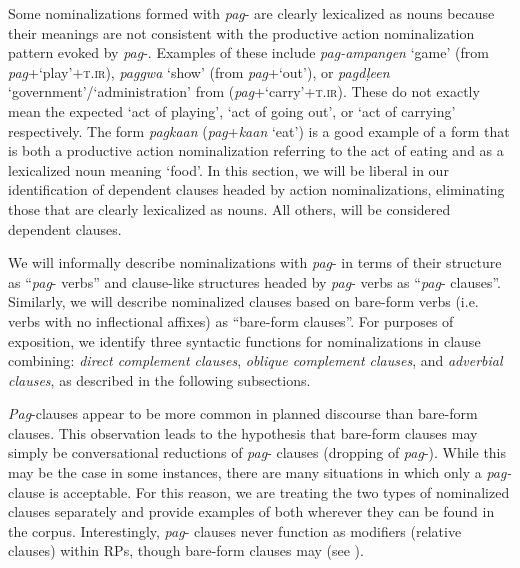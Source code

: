 Some nominalizations formed with \textit{pag}- are clearly lexicalized as nouns because their meanings are not consistent with the productive action nominalization pattern evoked by \textit{pag}-. Examples of these include \textit{pag-ampangen} ‘game’ (from \textit{pag}+‘play’+\textsc{t.ir}), \textit{paggwa} ‘show’ (from \textit{pag}+‘out’), or \textit{pagdļeen} ‘government’/‘administration’ from (\textit{pag}+‘carry’+\textsc{t.ir}). These do not exactly mean the expected ‘act of playing', ‘act of going out', or ‘act of carrying' respectively. The form \textit{pagkaan} (\textit{pag}+\textit{kaan} ‘eat’) is a good example of a form that is both a productive action nominalization referring to the act of eating and as a lexicalized noun meaning ‘food’. In this section, we will be liberal in our identification of dependent clauses headed by action nominalizations, eliminating those that are clearly lexicalized as nouns.  All others,  will be considered dependent clauses.

We will informally describe nominalizations with \textit{pag}{}- in terms of their structure as “\textit{pag}{}- verbs” and clause-like structures headed by \textit{pag}{}- verbs as “\textit{pag}{}- clauses”. Similarly, we will describe nominalized clauses based on bare-form verbs (i.e. verbs with no inflectional affixes) as “bare-form clauses”. For purposes of exposition, we identify three syntactic functions for nominalizations in clause combining: \textit{direct complement clauses}, \textit{oblique complement clauses}, and \textit{adverbial clauses}, as described in the following subsections.

\textit{Pag}{}-clauses appear to be more common in planned discourse than bare-form clauses. This observation leads to the hypothesis that bare-form clauses may simply be conversational reductions of \textit{pag}{}- clauses (dropping of \textit{pag}{}-). While this may be the case in some instances, there are many situations in which only a \textit{pag-} clause is acceptable. For this reason, we are treating the two types of nominalized clauses separately and provide examples of both wherever they can be found in the corpus. Interestingly, \textit{pag}{}- clauses never function as modifiers (relative clauses) within RPs, though bare-form clauses may (see ).

